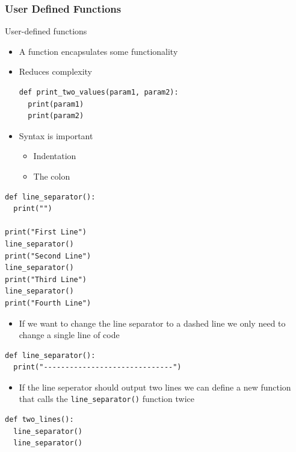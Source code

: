 \documentclass[10pt, a4paper]{beamer} %
\begin{document}
\begin{frame}\frametitle{User Defined Functions}
  \begin{block}{User-defined functions}
    \begin{itemize}
      \item A function encapsulates some functionality
      \item Reduces complexity
            \begin{lstlisting}
def print_two_values(param1, param2):
  print(param1)
  print(param2)
    \end{lstlisting}
      \item Syntax is important
            \begin{itemize}
              \item Indentation
              \item The colon
            \end{itemize}
    \end{itemize}
  \end{block}
  \framebreak
  \begin{examples}
    \begin{lstlisting}
def line_separator():
  print("")

print("First Line")
line_separator()
print("Second Line")
line_separator()
print("Third Line")
line_separator()
print("Fourth Line")
\end{lstlisting}
  \end{examples}
  \begin{itemize}
    \item If we want to change the line separator to a dashed line we only need to change a single line of code
  \end{itemize}
  \begin{lstlisting}
def line_separator():
  print("------------------------------")
\end{lstlisting}


  \framebreak

  \begin{examples}
    \begin{itemize}
      \item If the line seperator should output two lines we can define a new function that calls the \lstinline!line_separator()! function twice
    \end{itemize}
    \begin{lstlisting}
def two_lines():
  line_separator()
  line_separator()


\end{lstlisting}
\end{examples}
\end{frame}
\end{document}
